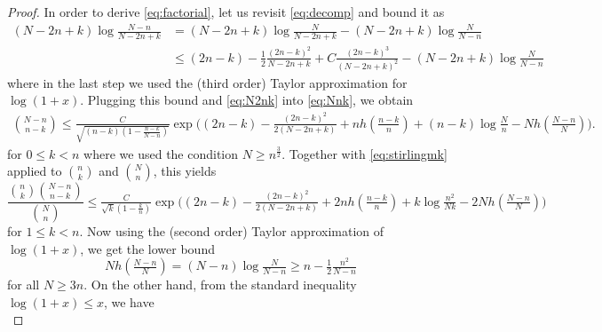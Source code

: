 \documentclass[10pt,a4paper]{amsart}
\begin{document}
\begin{proof}
In order to derive \eqref{eq:factorial}, let us revisit \eqref{eq:decomp} and 
bound it as
\begin{equation*}
\begin{split}
(N - 2n + k)\log \tfrac {N - n}{N - 2n + k} &= (N - 2n + k) \log \tfrac{N}{N - 2n + k} - (N - 2n + k)\log \tfrac{N}{N - n}\\
&\le (2n - k) - \tfrac12\tfrac{(2n - k)^2}{N - 2n + k}  %
+ C \tfrac{(2n - k)^3}{(N - 2n + k)^2}  - (N - 2n + k)\log \tfrac{N}{N - n}
\end{split}    
\end{equation*}
where in the last step we used the %
(third order) Taylor approximation for $\log (1 + x)$. Plugging this bound and 
\eqref{eq:N2nk} into %
\eqref{eq:Nnk}, we obtain
\begin{equation*}
\begin{split}
\binom{N - n}{n-k}
\le \tfrac{C}{\sqrt{(n - k)(1 - \frac{n - k}{N - n})}} \exp\big((2n - k) - 
\tfrac{(2n - k)^2}{2(N - 2n + k)} + nh(\tfrac{n-k}{n}) + (n-k) \log \tfrac N n - 
N h(\tfrac{N-n}N)\big).
\end{split}
\end{equation*}
for $0 \le k < n$ where we used the condition $N \ge n^{\frac32}$. Together with 
\eqref{eq:stirlingmk} applied to $\binom{n}{k}$ and $\binom{N}{n}$, this yields
\begin{equation}\label{eq:factorial0}
\frac{\binom{n}{k}\binom{N - n}{n - k}}{\binom{N}{n}} \le \tfrac{C}{\sqrt{k}(1 - \frac k n)}\exp\big((2n - k) - \tfrac{(2n - k)^2}{2(N - 2n + k)} + 2nh(\tfrac{n-k}{n}) + %
k \log \tfrac{n^2}{Nk} - 2 N h(\tfrac{N-n}N) \big)
\end{equation}
for %
$1 \le k < n$. Now using the (second order) Taylor approximation of $\log (1 + x)$, we get the lower bound
\begin{equation*}
N h(\tfrac{N-n}N) = (N - n)\log \tfrac N{N-n} \ge n - \tfrac12 \tfrac{n^2}{N - n}
\end{equation*}
for all $N \ge 3n$. On the other hand, from the standard inequality $\log (1 + x) \le x$, we have
\begin{equation*}

\end{equation*}
\end{proof}
\end{document}
